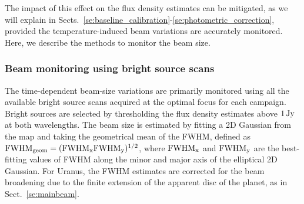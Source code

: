 The impact of this effect on the flux density estimates can be
mitigated, as we will explain in
Sects.~\ref{se:baseline_calibration}-\ref{se:photometric_correction},
provided the temperature-induced beam variations are accurately
monitored. Here, we describe the methods to monitor the beam size.   


\subsubsection{Beam monitoring using bright source scans}
\label{se:beam_monitoring_otf}

The time-dependent beam-size variations are primarily monitored using
all the available bright source scans acquired at the optimal focus
for each campaign. Bright sources are selected by thresholding the
flux density estimates above $1\,\rm{Jy}$ at both wavelengths.
The beam size is estimated by fitting a 2D Gaussian from the map and
taking the geometrical mean of the FWHM, defined as 
$\rm{FWHM}_{\rm{geom}} = (\rm{FWHM}_x \rm{FWHM}_y)^{1/2}$, where
$\rm{FWHM}_x$ and $\rm{FWHM}_y$ are the best-fitting values of FWHM
along the minor and major axis of the elliptical 2D Gaussian.
For Uranus, the FWHM estimates are corrected for the beam broadening due
to the finite extension of the apparent disc of the planet, as in Sect.~\ref{se:mainbeam}. 

